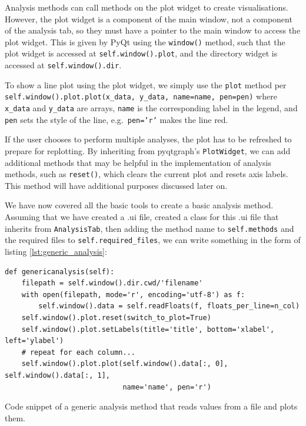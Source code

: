 \documentclass[12pt]{article}
\newenvironment{code}{\captionsetup{type=listing}}{\par\addvspace{\baselineskip}}
\begin{document}
Analysis methods can call methods on the plot widget to create visualisations. However, the plot widget is a component of the main window, not a component of the analysis tab, so they must have a pointer to the main window to access the plot widget. This is given by PyQt using the \texttt{window()} method, such that the plot widget is accessed at \texttt{self.window().plot}, and the directory widget is accessed at \texttt{self.window().dir}.

To show a line plot using the plot widget, we simply use the \texttt{plot} method per \texttt{self.window().plot.plot(x_data, y_data, name=name, pen=pen)} where \texttt{x\_data} and \texttt{y\_data} are arrays, \texttt{name} is the corresponding label in the legend, and \texttt{pen} sets the style of the line, e.g.~\texttt{pen='r'} makes the line red.

If the user chooses to perform multiple analyses, the plot has to be refreshed to prepare for replotting. By inheriting from pyqtgraph's \texttt{PlotWidget}, we can add additional methods that may be helpful in the implementation of analysis methods, such as \texttt{reset()}, which clears the current plot and resets axis labels. This method will have additional purposes discussed later on.

We have now covered all the basic tools to create a basic analysis method. Assuming that we have created a .ui file, created a class for this .ui file that inherits from \texttt{AnalysisTab}, then adding the method name to \texttt{self.methods} and the required files to \texttt{self.required_files}, we can write something in the form of listing \ref{lst:generic_analysis}:

\begin{code}\begin{verbatim}
def genericanalysis(self):
    filepath = self.window().dir.cwd/'filename'
    with open(filepath, mode='r', encoding='utf-8') as f:
        self.window().data = self.readFloats(f, floats_per_line=n_col)
    self.window().plot.reset(switch_to_plot=True)
    self.window().plot.setLabels(title='title', bottom='xlabel', left='ylabel')
    # repeat for each column...
    self.window().plot.plot(self.window().data[:, 0], self.window().data[:, 1],
                            name='name', pen='r')
\end{verbatim}
\caption{Code snippet of a generic analysis method that reads values from a file and plots them.}
\label{lst:generic_analysis}
\end{code}
\end{document}
